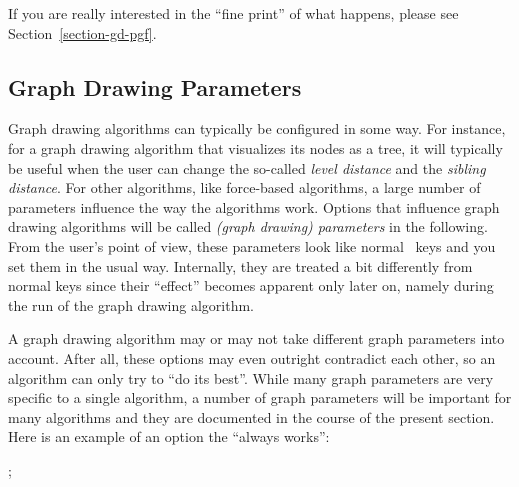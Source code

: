 If you are really interested in the ``fine print'' of what happens,
please see Section~\ref{section-gd-pgf}.


\subsection{Graph Drawing Parameters}

Graph drawing algorithms can typically be configured in some way. For
instance, for a graph drawing algorithm that visualizes its nodes as a
tree, it will typically be useful when the user can change the
so-called \emph{level distance} and the \emph{sibling distance}. For
other algorithms, like force-based algorithms, a large number of
parameters influence the way the algorithms work.
Options that influence graph drawing algorithms will be called
\emph{(graph drawing) parameters} in the following. From the user's
point of view, these parameters look like normal \tikzname\ keys and
you set them in the usual way. Internally, they are treated a bit
differently from normal keys since their ``effect'' becomes apparent
only later on, namely during the run of the graph drawing algorithm.

A graph drawing algorithm may or may not take different graph 
parameters into account. After all, these options may even outright
contradict each other, so an algorithm can only try to ``do its
best''. While many graph parameters are very specific to a single
algorithm, a number of graph parameters will be important for many
algorithms and they are documented in the course of the present
section. Here is an example of an option the ``always works'':

\begin{codeexample}[]
\tikz {};  
\end{codeexample}







